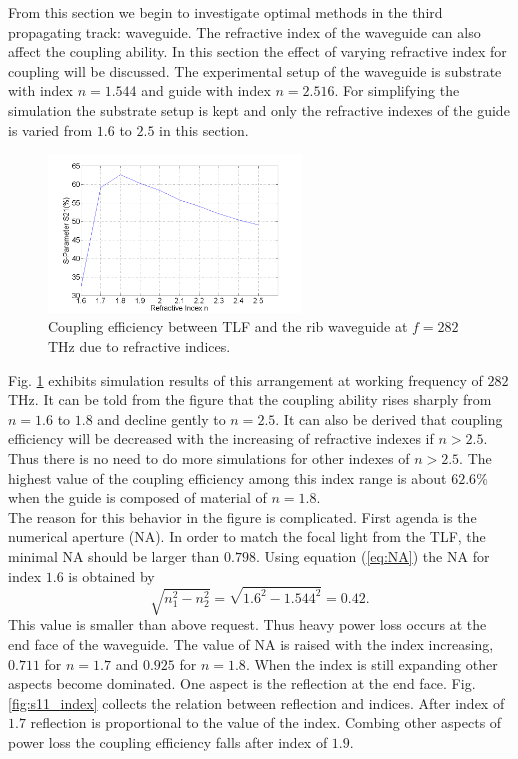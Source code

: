 From this section we begin to investigate optimal methods in the third propagating track: waveguide. The refractive index of the waveguide can also affect the coupling ability. In this section the effect of varying refractive index for coupling will be discussed. The experimental setup of the waveguide is substrate with index $n=1.544$ and guide with index $n=2.516$. For simplifying the simulation the substrate setup is kept and only the refractive indexes of the guide is varied from $1.6$ to $2.5$ in this section.\\

\begin{figure}[!ht]
\centering
\includegraphics[width=0.6\textwidth]{bilder/s21_refractive_index}
\caption{Coupling efficiency between TLF and the rib waveguide at $f=282$THz due to refractive indices.}
\label{fig:refractive_index}
\end{figure}
Fig. \ref{fig:refractive_index} exhibits simulation results of this arrangement at working frequency of $282$ THz. It can be told from the figure that the coupling ability rises sharply from $n=1.6$ to $1.8$ and decline gently to $n=2.5$. It can also be derived that coupling efficiency will be decreased with the increasing of refractive indexes if $n>2.5$. Thus there is no need to do more simulations for other indexes of $n>2.5$. The highest value of the coupling efficiency among this index range is about $62.6\%$ when the guide is composed of material of $n=1.8$.\\

The reason for this behavior in the figure is complicated. First agenda is the numerical aperture (NA). In order to match the focal light from the TLF, the minimal NA should be larger than $0.798$. Using equation (\ref{eq:NA}) the NA for index $1.6$ is obtained by
\begin{equation*}
\sqrt{n_{1}^2-n_{2}^2}=\sqrt{1.6^2-1.544^2}=0.42.
\end{equation*}
This value is smaller than above request. Thus heavy power loss occurs at the end face of the waveguide. The value of NA is raised with the index increasing, $0.711$ for $n=1.7$ and $0.925$ for $n=1.8$.  When the index is still expanding other aspects become dominated. One aspect is the reflection at the end face. Fig. \ref{fig:s11_index} collects the relation between reflection and indices. After index of $1.7$ reflection is proportional to the value of the index. Combing other aspects of power loss the coupling efficiency falls after index of $1.9$.\\
  

